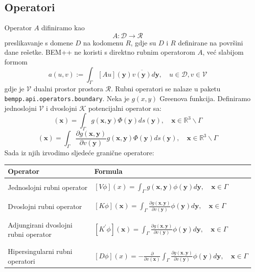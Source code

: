 \documentclass[a4paper,twoside,12pt]{memoir} %
\begin{document}
\subsection{Operatori}
Operator $A$ difiniramo kao $$A:\mathcal{D} \rightarrow \mathcal{R}$$ preslikavanje s domene $D$ na kodomenu $R$, gdje su $D$ i $R$ definirane na površini dane rešetke. BEM++ ne koristi s direktno rubnim operatorom $A$, već slabijom formom 
\begin{equation}
a(u,v):=\int_\Gamma[Au](\mathbf{y})\overline{v(\mathbf{y})}d\mathbf{y},\quad u\in \mathcal{D}, v\in \mathcal{V}
\end{equation}  
gdje je $\mathcal{V}$ dualni prostor prostora $\mathcal{R}$. Rubni operatori se nalaze u paketu \newline \texttt{bempp.api.operators.boundary}. Neka je $g(x,y)$ Greenova funkcija. Definiramo jednoslojni $\mathcal{V}$ i dvoslojni $\mathcal{K}$ potencijalni operator sa:
\begin{equation}
[\mathcal{V}\Phi](\mathbf{x})=\int_\Gamma g(\mathbf{x},\mathbf{y})\Phi(\mathbf{y})ds(\mathbf{y}), \quad \mathbf{x}\in \mathbb{R}^{3}\backslash \Gamma
\end{equation}
\begin{equation}
[\mathcal{K}\Phi](\mathbf{x})=\int_\Gamma \frac{\partial g(\mathbf{x},\mathbf{y})}{\partial v(\mathbf{y})}g(\mathbf{x},\mathbf{y})\Phi(\mathbf{y})ds(\mathbf{y}), \quad \mathbf{x}\in \mathbb{R}^{3}\backslash \Gamma
\end{equation}
Sada iz njih izvodimo sljedeće granične operatore:

\begin{table}[H]
\begin{tabular}{m{7cm} m{7cm}}
\large{Operator} & \large{Formula} \\ \hline \\
 Jednoslojni rubni operator & $[V\phi](x)=\int_\Gamma g(\mathbf{x},\mathbf{y})\phi(\mathbf{y})d\mathbf{y},\quad \mathbf{x}\in \Gamma$ \\ \\ \hline \\
Dvoslojni rubni operator & $[K\phi](\mathbf{x})=\int_\Gamma\frac{\partial g(\mathbf{x},\mathbf{y})}{\partial v(\mathbf{y})}\phi(\mathbf{y})d\mathbf{y}, \quad \mathbf{x}\in \Gamma$ \\\\ \hline \\
Adjungirani dvoslojni rubni operator & $[K^{'}\phi](\mathbf{x})=\int_\Gamma\frac{\partial g(\mathbf{x},\mathbf{y})}{\partial v(\mathbf{y})}\phi(\mathbf{y})d\mathbf{y}, \quad \mathbf{x}\in \Gamma$ \\\\ \hline \\
 Hipersingularni rubni operatori& $[D\phi](x)=-\frac{\partial}{\partial v(\mathbf{x})}\int_\Gamma \frac{\partial g(\mathbf{x},\mathbf{y})}{\partial v(\mathbf{y})}\phi(\mathbf{y})d\mathbf{y}, \quad \mathbf{x} \in \Gamma$
\end{tabular}
\end{table}
\end{document}
